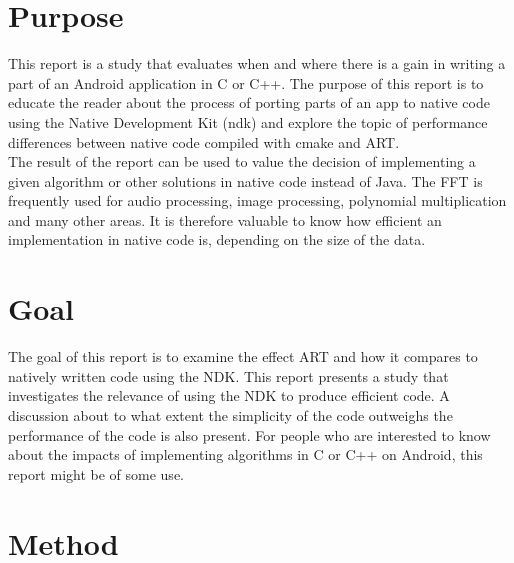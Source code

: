 \section{Purpose}
This report is a study that evaluates when and where there is a gain in writing a part of an Android application in C or C++. The purpose of this report is to educate the reader about the process of porting parts of an app to native code using the Native Development Kit (\gls{ndk}) and explore the topic of performance differences between native code compiled with \gls{cmake} and ART.\\

The result of the report can be used to value the decision of implementing a given algorithm or other solutions in native code instead of Java. The FFT is frequently used for audio processing, image processing, polynomial multiplication and many other areas. It is therefore valuable to know how efficient an implementation in native code is, depending on the size of the data.

% 
\section{Goal}
The goal of this report is to examine the effect ART and how it compares to natively written code using the NDK. This report presents a study that investigates the relevance of using the NDK to produce efficient code. A discussion about to what extent the simplicity of the code outweighs the performance of the code is also present. For people who are interested to know about the impacts of implementing algorithms in C or C++ on Android, this report might be of some use.

\section{Method}

